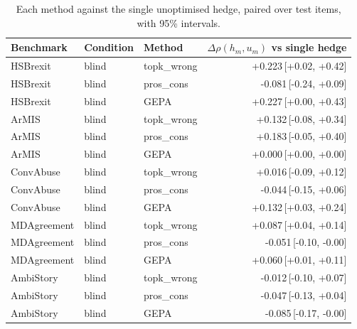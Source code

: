 \begin{table}[t]
\centering
\small
\begin{tabular}{lllr}
\hline
Benchmark & Condition & Method & $\Delta\rho(h_m,u_m)$ vs single hedge \\
\hline
HSBrexit & blind & topk\_wrong & +0.223{\scriptsize\,[+0.02, +0.42]} \\
HSBrexit & blind & pros\_cons & -0.081{\scriptsize\,[-0.24, +0.09]} \\
HSBrexit & blind & GEPA & +0.227{\scriptsize\,[+0.00, +0.43]} \\
ArMIS & blind & topk\_wrong & +0.132{\scriptsize\,[-0.08, +0.34]} \\
ArMIS & blind & pros\_cons & +0.183{\scriptsize\,[-0.05, +0.40]} \\
ArMIS & blind & GEPA & +0.000{\scriptsize\,[+0.00, +0.00]} \\
ConvAbuse & blind & topk\_wrong & +0.016{\scriptsize\,[-0.09, +0.12]} \\
ConvAbuse & blind & pros\_cons & -0.044{\scriptsize\,[-0.15, +0.06]} \\
ConvAbuse & blind & GEPA & +0.132{\scriptsize\,[+0.03, +0.24]} \\
MDAgreement & blind & topk\_wrong & +0.087{\scriptsize\,[+0.04, +0.14]} \\
MDAgreement & blind & pros\_cons & -0.051{\scriptsize\,[-0.10, -0.00]} \\
MDAgreement & blind & GEPA & +0.060{\scriptsize\,[+0.01, +0.11]} \\
AmbiStory & blind & topk\_wrong & -0.012{\scriptsize\,[-0.10, +0.07]} \\
AmbiStory & blind & pros\_cons & -0.047{\scriptsize\,[-0.13, +0.04]} \\
AmbiStory & blind & GEPA & -0.085{\scriptsize\,[-0.17, -0.00]} \\
\hline
\end{tabular}
\caption{Each method against the single unoptimised hedge, paired over test items, with 95\% intervals.}
\label{tab:paired-methods}
\end{table}